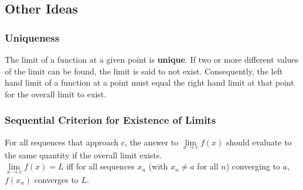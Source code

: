 \documentclass[14]{article}
\theoremstyle{definition}
\begin{document}
\subsection{Other Ideas}
\subsubsection{Uniqueness}
The limit of a function at a given point is \textbf{unique}. If two or more different values of the limit can be found, the limit is said to not exist. Consequently, the left hand limit of a function at a point must equal the right hand limit at that point for the overall limit to exist.
\subsubsection{Sequential Criterion for Existence of Limits}
For all sequences that approach $c$, the answer to $\lim\limits_{x \rightarrow c} f(x)$ should evaluate to the same quantity if the overall limit exists.\\
$\lim\limits_{x \to c} f(x) = L$ iff for all sequences $x_n$ (with $x_n \neq a$ for all $n$) converging to $a$, $f(x_n)$ converges to $L$.
\pagebreak
\end{document}
